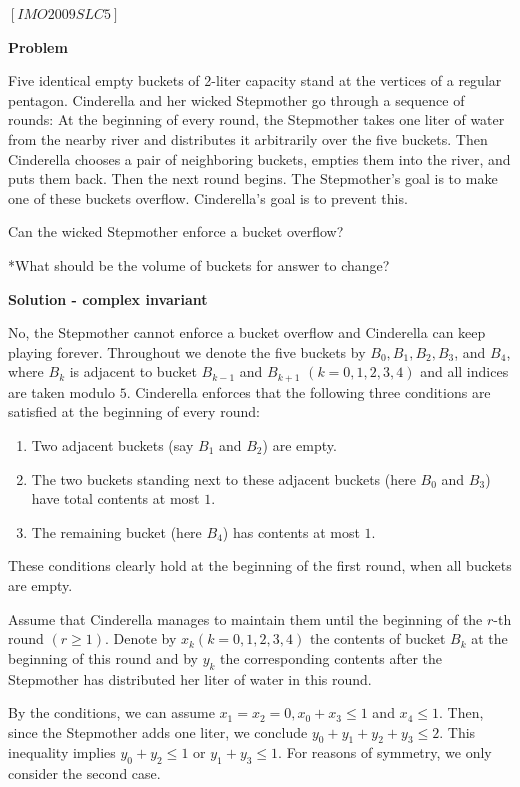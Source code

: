 \begin{problem}
$[IMO2009SLC5]$

\textbf{Problem}

Five identical empty buckets of 2-liter capacity stand at the vertices of a regular pentagon. Cinderella and her wicked Stepmother go through a sequence of rounds: At the beginning of every round, the Stepmother takes one liter of water from the nearby river and distributes it arbitrarily over the ﬁve buckets. Then Cinderella chooses a pair of neighboring buckets, empties them into the river, and puts them back. Then the next round begins. The Stepmother’s goal is to make one of these buckets overﬂow. Cinderella’s goal is to prevent this. 

Can the wicked Stepmother enforce a bucket overﬂow?

*What should be the volume of buckets for answer to change?


\textbf{Solution - complex invariant }

 No, the Stepmother cannot enforce a bucket overﬂow and Cinderella can keep playing forever. Throughout we denote the ﬁve buckets by $B_0,B_1,B_2,B_3$, and $B_4$, where $B_k$ is adjacent to bucket $B_{k−1}$ and $B_{k+1}$ $(k = 0,1,2,3,4)$ and all indices are taken modulo $5$. Cinderella enforces that the following three conditions are satisﬁed at the beginning of every round: 
 \begin{enumerate}
 \item Two adjacent buckets (say $B_1$ and $B_2$) are empty. 
 \item The two buckets standing next to these adjacent buckets (here $B_0$ and $B_3$) have total contents at most $1$. 
 \item The remaining bucket (here $B_4$) has contents at most $1$. 
\end{enumerate} 
 These conditions clearly hold at the beginning of the ﬁrst round, when all buckets are empty. 
 
 Assume that Cinderella manages to maintain them until the beginning of the $r$-th round $(r \ge 1)$. Denote by $x_k (k = 0,1,2,3,4)$ the contents of bucket $B_k$ at the beginning of this round and by $y_k$ the corresponding contents after the Stepmother has distributed her liter of water in this round. 
 
 By the conditions, we can assume $x_1 = x_2 = 0, x_0 + x_3 \le 1$ and $x_4 \le 1$. Then, since the Stepmother adds one liter, we conclude $y_0+y_1+y_2+y_3 \le 2$. This inequality implies $y_0+y_2 \le 1$ or $y_1 + y_3 \le 1$. For reasons of symmetry, we only consider the second case. 
 

\end{problem}

